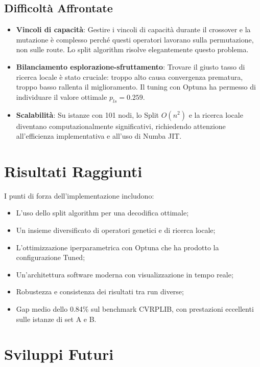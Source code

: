 \subsection{Difficolt\`a Affrontate}

\begin{itemize}
    \item \textbf{Vincoli di capacit\`a}: Gestire i vincoli di capacit\`a durante
    il crossover e la mutazione \`e complesso perch\'e questi operatori lavorano
    sulla permutazione, non sulle route. Lo split algorithm risolve elegantemente
    questo problema.

    \item \textbf{Bilanciamento esplorazione-sfruttamento}: Trovare il giusto
    tasso di ricerca locale \`e stato cruciale: troppo alto causa convergenza
    prematura, troppo basso rallenta il miglioramento. Il tuning con Optuna ha
    permesso di individuare il valore ottimale $p_{ls} = 0.259$.

    \item \textbf{Scalabilit\`a}: Su istanze con 101 nodi, lo Split $O(n^2)$ e
    la ricerca locale diventano computazionalmente significativi, richiedendo
    attenzione all'efficienza implementativa e all'uso di Numba JIT.
\end{itemize}

\section{Risultati Raggiunti}

I punti di forza dell'implementazione includono:
\begin{itemize}
    \item L'uso dello split algorithm per una decodifica ottimale;
    \item Un insieme diversificato di operatori genetici e di ricerca locale;
    \item L'ottimizzazione iperparametrica con Optuna che ha prodotto la
    configurazione Tuned;
    \item Un'architettura software moderna con visualizzazione in tempo reale;
    \item Robustezza e consistenza dei risultati tra run diverse;
    \item Gap medio dello 0.84\% sul benchmark CVRPLIB, con prestazioni
    eccellenti sulle istanze di set A e B.
\end{itemize}

\section{Sviluppi Futuri}


